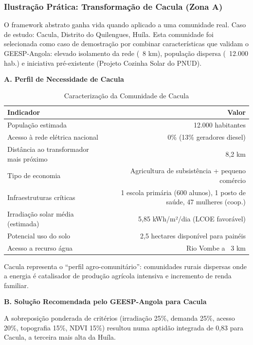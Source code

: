 \documentclass[12pt, a4paper]{article}
\begin{document}
\subsubsection{Ilustração Prática: Transformação de Cacula (Zona A)}

O framework abstrato ganha vida quando aplicado a uma comunidade real. Caso de estudo: 
Cacula, Distrito do Quilengues, Huíla. Esta comunidade foi selecionada como caso de 
demostração por combinar características que validam o GEESP-Angola: elevado isolamento 
da rede (~8 km), população dispersa (~12.000 hab.) e iniciativa pré-existente (Projeto 
Cozinha Solar do PNUD).

\textbf{A. Perfil de Necessidade de Cacula}

\begin{table}[H]
\centering
\caption{Caracterização da Comunidade de Cacula}
\label{tab:cacula_profile}
\small
\begin{tabular}{|l|r|}
\hline
\textbf{Indicador} & \textbf{Valor} \\
\hline
População estimada & 12.000 habitantes \\
Acesso à rede elétrica nacional & 0\% (13\% geradores diesel) \\
Distância ao transformador mais próximo & 8,2 km \\
Tipo de economia & Agricultura de subsistência + pequeno comércio \\
Infraestruturas críticas & 1 escola primária (600 alunos), 1 posto de saúde, 47 mulheres (coop.) \\
Irradiação solar média (estimada) & 5,85 kWh/m²/dia (LCOE favorável) \\
Potencial uso do solo & 2,5 hectares disponível para painéis \\
Acesso a recurso água & Rio Vombe a ~3 km \\
\hline
\end{tabular}
\end{table}

Cacula representa o ``perfil agro-comunitário'': comunidades rurais dispersas onde a energia 
é catalisador de produção agrícola intensiva e incremento de renda familiar.

\textbf{B. Solução Recomendada pelo GEESP-Angola para Cacula}

A sobreposição ponderada de critérios (irradiação 25\%, demanda 25\%, acesso 20\%, 
topografia 15\%, NDVI 15\%) resultou numa aptidão integrada de 0,83 para Cacula, a terceira 
mais alta da Huíla.
\end{document}

